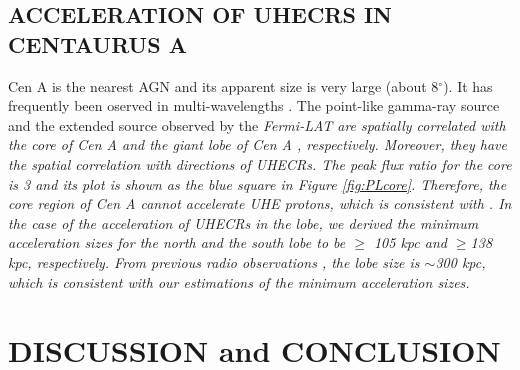 \documentclass{aastex6}
\begin{document}
\subsection{ACCELERATION OF UHECRS IN CENTAURUS A}
\label{sec:CenA}
Cen A is the nearest AGN and its apparent size is very large (about 8$^{\circ}$). It has frequently been oserved in multi-wavelengths \citep[e.g.,][]{Steinle, Meisenheimer, Aharonian, Fukazawa}.
The point-like gamma-ray source and the extended source observed by the \it{Fermi}\rm{}-LAT are spatially correlated with the core of Cen A \citep{CenAcore} and the giant lobe of Cen A \citep{CenAlobe}, respectively.
Moreover, they have the spatial correlation with directions of UHECRs.
The peak flux ratio for the core is 3 and its plot is shown as the blue square in Figure \ref{fig:PLcore}.
Therefore, the core region of Cen A cannot accelerate UHE \it{protons}\rm{}, which is consistent with \cite{PL}.
In the case of the acceleration of UHECRs in the lobe, we derived the minimum acceleration sizes for the north and the south lobe to be $\geq$ 105 kpc and $\geq$138 kpc, respectively.
From previous radio observations \citep[e.g.,][]{Shain,Burns}, the lobe size is $\sim$300 kpc, which is consistent with our estimations of the minimum acceleration sizes.

\section{DISCUSSION and CONCLUSION}
\label{sec:discuss}
\end{document}

